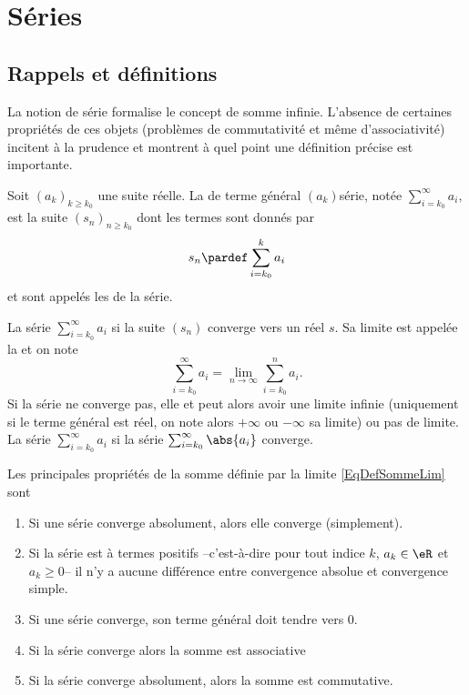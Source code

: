 

\section{Séries}
\label{secseries}

\subsection{Rappels et définitions}
La notion de série formalise le concept de somme infinie. L'absence de
certaines propriétés de ces objets (problèmes de commutativité et même
d'associativité) incitent à la prudence et montrent à quel point une
définition précise est importante.

Soit ${(a_k)}_{k \geq k_0}$ une suite réelle. La  de terme
général $(a_k)${série}, notée
\begin{math}
  \sum_{i=k_0}^\infty a_i,
\end{math}
est la suite ${(s_n)}_{n \geq k_0}$ dont les termes sont donnés par
\begin{equation*}
  s_n \pardef \sum_{i=k_0}^k a_i
\end{equation*}
et sont appelés les  de la série.

La série $\sum_{i=k_0}^\infty a_i$  si la suite $(s_n)$
converge vers un réel $s$. Sa limite est appelée la  et on note
\begin{equation}		\label{EqDefSommeLim}
  \sum_{i=k_0}^\infty a_i = \lim_{n\to\infty}\sum_{i=k_0}^na_i.
\end{equation}
Si la série ne converge pas, elle  et peut alors avoir
une limite infinie (uniquement si le terme général est réel, on note
alors $+\infty$ ou $-\infty$ sa limite) ou pas de limite.  La série
$\sum_{i=k_0}^\infty a_i$  si la série
$\sum_{i=k_0}^\infty \abs{a_i}$ converge.

\begin{proposition}\label{propnseries_propdebase}
Les principales propriétés de la somme définie par la limite \eqref{EqDefSommeLim} sont
  \begin{enumerate}
  \item Si une série converge absolument, alors elle converge
    (simplement).
  \item Si la série est à termes positifs --c'est-à-dire pour tout
    indice $k$, $a_k \in \eR$ et $a_k \geq 0$-- il n'y a aucune
    différence entre convergence absolue et convergence simple.
  \item\label{point3-seriepropdebase} Si une série converge, son terme général doit tendre vers $0$.
\item 
Si la série converge alors la somme est associative
\item
Si la série converge absolument, alors la somme est commutative.
  \end{enumerate}
\end{proposition}


